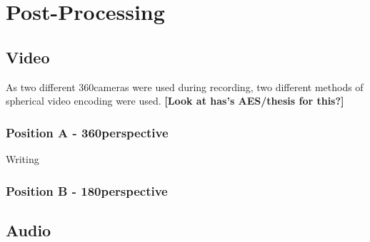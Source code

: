 \section{Post-Processing} %
	\subsection{Video}
		As two different 360\textdegree cameras were used during recording, two different methods of spherical video encoding were used. \textbf{[Look at has's AES/thesis for this?]}

			\subsubsection{Position A - 360\textdegree perspective}
				Writing

			\subsubsection{Position B - 180\textdegree perspective}

	\subsection{Audio}

